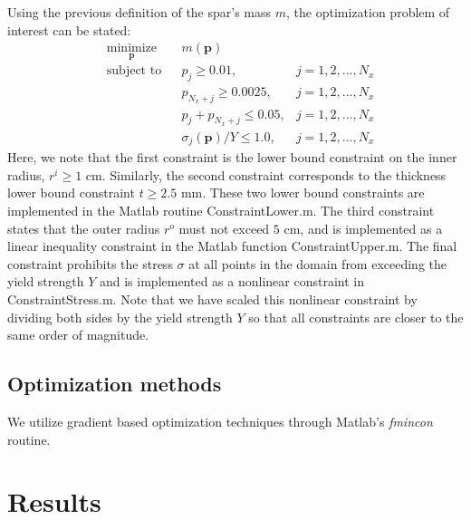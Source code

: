 \documentclass[11pt]{article}
\newcommand{\bs}[1] {\boldsymbol{#1}}
\begin{document}
Using the previous definition of the spar's mass $m$, the
optimization problem of interest can be stated:
\begin{equation}
\begin{aligned}
& \underset{\bs{p}}{\text{minimize}}
& & m(\bs{p}) \\
& \text{subject to}
& & p_j \geq 0.01,                    &j=1,2,\dots,N_x \\
&&& p_{N_x+j} \geq 0.0025,            &j=1,2,\dots,N_x\\
&&& p_j + p_{N_x +j} \leq 0.05,       &j=1,2,\dots,N_x \\
&&& \sigma_j(\bs{p})/Y \leq 1.0,      &j=1,2,\dots,N_x
\end{aligned}
\end{equation}
Here, we note that the first constraint is the lower bound
constraint on the inner radius, $r^i \geq 1$ cm. Similarly,
the second constraint corresponds to the thickness lower
bound constraint $t \geq 2.5$ mm. These two lower bound
constraints are implemented in the Matlab routine
ConstraintLower.m. The third constraint states that the
outer radius $r^o$ must not exceed $5$ cm, and is implemented
as a linear inequality constraint in the Matlab function
ConstraintUpper.m. The final constraint prohibits the
stress $\sigma$ at all points in the domain from exceeding
the yield strength $Y$ and is implemented as a nonlinear
constraint in ConstraintStress.m. Note that we have scaled
this nonlinear constraint by dividing both sides by the
yield strength $Y$ so that all constraints are closer
to the same order of magnitude.

\subsection{Optimization methods}

We utilize gradient based optimization techniques through
Matlab's \emph{fmincon} routine.



\section{Results}
\end{document}
